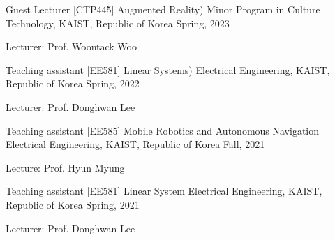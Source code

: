 

\begin{cventries}

  \cventry
    {Guest Lecturer} %
    {[CTP445] Augmented Reality)} %
    {Minor Program in Culture Technology, KAIST, Republic of Korea} %
    {Spring, 2023} %
    {
      \begin{cvitems} %
        \item {Lecturer: Prof. Woontack Woo}
      \end{cvitems}
    }

  \cventry
    {Teaching assistant} %
    {[EE581] Linear Systems)} %
    {Electrical Engineering, KAIST, Republic of Korea} %
    {Spring, 2022} %
    {
      \begin{cvitems} %
        \item {Lecturer: Prof. Donghwan Lee}
      \end{cvitems}
    }

  \cventry
    {Teaching assistant} %
    {[EE585] Mobile Robotics and Autonomous Navigation} %
    {Electrical Engineering, KAIST, Republic of Korea} %
    {Fall, 2021} %
    {
      \begin{cvitems} %
        \item {Lecture: Prof. Hyun Myung}
      \end{cvitems}
    }

  \cventry
    {Teaching assistant} %
    {[EE581] Linear System} %
    {Electrical Engineering, KAIST, Republic of Korea} %
    {Spring, 2021} %
    {
      \begin{cvitems} %
        \item {Lecturer: Prof. Donghwan Lee}
      \end{cvitems}
    }


\end{cventries}
